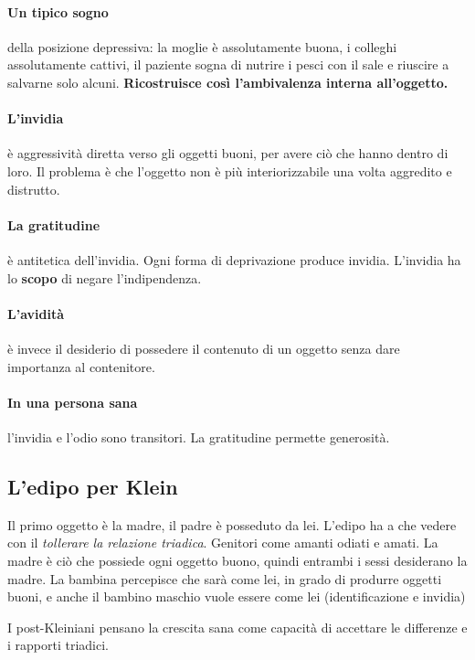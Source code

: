 \documentclass[12pt, a4paper]{article}
\begin{document}
\paragraph{Un tipico sogno} della posizione depressiva: la moglie \`e assolutamente buona, i colleghi assolutamente cattivi, il paziente sogna di nutrire i pesci con il sale e riuscire a salvarne solo alcuni.
\textbf{Ricostruisce cos\`i l'ambivalenza interna all'oggetto.}

\paragraph{L'invidia} \`e aggressivit\`a diretta verso gli oggetti buoni, per avere ciò che hanno dentro di loro. Il problema \`e che l'oggetto non \`e pi\`u interiorizzabile una volta aggredito e distrutto.

\paragraph{La gratitudine} \`e antitetica dell'invidia. Ogni forma di deprivazione produce invidia. L'invidia ha lo \textbf{scopo} di negare l'indipendenza.

\paragraph{L'avidit\`a} \`e invece il desiderio di possedere il contenuto di un oggetto senza dare importanza al contenitore.

\paragraph{In una persona sana} l'invidia e l'odio sono transitori. La gratitudine permette generosit\`a.

\subsection{L'edipo per Klein}

Il primo oggetto \`e la madre, il padre \`e posseduto da lei. L'edipo ha a che vedere con il \emph{tollerare la relazione triadica}. Genitori come amanti odiati e amati. La madre \`e ciò che possiede ogni oggetto buono, quindi entrambi i sessi desiderano la madre. La bambina percepisce che sar\`a come lei, in grado di produrre oggetti buoni, e anche il bambino maschio vuole essere come lei (identificazione e invidia)

I post-Kleiniani pensano la crescita sana come capacit\`a di accettare le differenze e i rapporti triadici.
\end{document}
